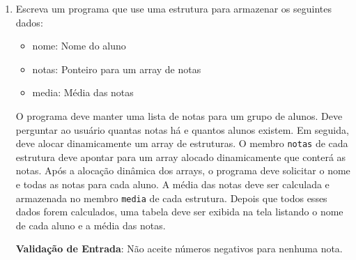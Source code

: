 \documentclass[12pt]{article}
\begin{document}
\begin{enumerate}
    \item Escreva um programa que use uma estrutura para armazenar os seguintes dados:
        \begin{itemize}
            \item nome: Nome do aluno
            \item notas: Ponteiro para um array de notas
            \item media: Média das notas
        \end{itemize}
        O programa deve manter uma lista de notas para um grupo de alunos. Deve perguntar ao usuário quantas notas há e quantos alunos existem. Em seguida, deve alocar dinamicamente um array de estruturas. O membro \texttt{notas} de cada estrutura deve apontar para um array alocado dinamicamente que conterá as notas. Após a alocação dinâmica dos arrays, o programa deve solicitar o nome e todas as notas para cada aluno. A média das notas deve ser calculada e armazenada no membro \texttt{media} de cada estrutura. Depois que todos esses dados forem calculados, uma tabela deve ser exibida na tela listando o nome de cada aluno e a média das notas. 

        \textbf{Validação de Entrada}: Não aceite números negativos para nenhuma nota.

\end{enumerate}
\end{document}
